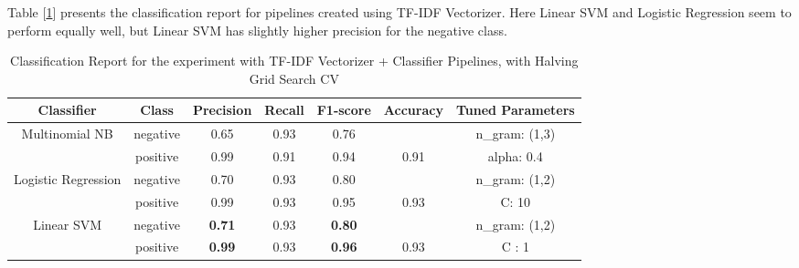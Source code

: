 \documentclass[11pt]{article}
\begin{document}
Table [\ref{tab:tfidf_class_report}] presents the classification report for pipelines created using TF-IDF Vectorizer. Here Linear SVM and Logistic Regression seem to perform equally well, but Linear SVM has slightly higher precision for the negative class.
\begin{table}
\scriptsize
    \centering
    \begin{tabular}{c c c c c c c} 
    \hline
       \textbf{Classifier}& \textbf{Class} & \textbf{Precision} &  \textbf{Recall} & \textbf{F1-score}  & \textbf{Accuracy} &\textbf{Tuned Parameters} \\ \hline 
       Multinomial NB & negative &0.65 &0.93  & 0.76 & & n\_gram: (1,3)\\
       & positive &0.99 &0.91 &0.94&0.91& alpha: 0.4\\ \hline 
       
       Logistic Regression & negative &0.70&0.93 & 0.80 & & n\_gram: (1,2) \\
       & positive&0.99 &0.93 &0.95&0.93&C: 10\\ \hline 
       
       Linear SVM & negative& \textbf{0.71} &0.93 &\textbf{0.80} & &n\_gram: (1,2)\\ 
       & positive & \textbf{0.99}&0.93& \textbf{0.96} &0.93&C : 1\\ \hline 
    \end{tabular}
    \caption{Classification Report for the experiment with TF-IDF Vectorizer + Classifier Pipelines, with Halving Grid Search CV }
    \label{tab:tfidf_class_report}
\end{table}
\end{document}
